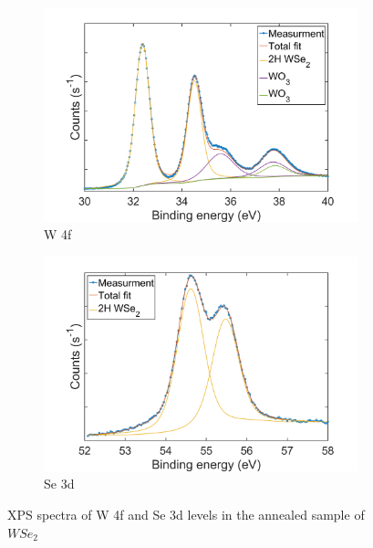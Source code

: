 \begin{figure}[H]
	\begin{center}
		\begin{subfigure}[b]{0.7\textwidth}
			\includegraphics[width=\textwidth]{1T'/XPSW4fAnn.png}
			\caption{W 4f}
			\label{fig:1T'XPSW4fAnnSpectrum}
		\end{subfigure}
		\qquad
		\begin{subfigure}[b]{0.7\textwidth}
			\includegraphics[width=\textwidth]{1T'/XPSSe3dAnn.png}
			\caption{Se 3d}
			\label{fig:1T'XPSSe3dAnnSpectrum}
		\end{subfigure}
		\caption{XPS spectra of W 4f and Se 3d levels in the annealed sample of $WSe_2$}
		\label{fig:1T'XPSAnnSpectra}
	\end{center}
\end{figure}

